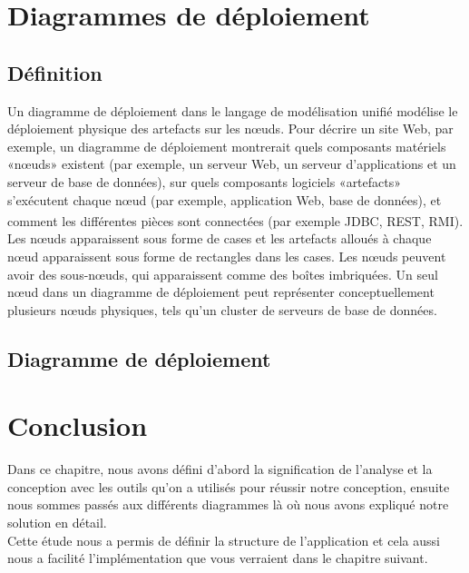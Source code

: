 \documentclass[12pt]{report}
\begin{document}
\newpage

\section{Diagrammes de déploiement}
\subsection{Définition}
\hspace*{0.16in}
Un diagramme de déploiement dans le langage de modélisation unifié modélise le déploiement physique des artefacts sur les nœuds. Pour décrire un site Web, par exemple, un diagramme de déploiement montrerait quels composants matériels «nœuds» existent (par exemple, un serveur Web, un serveur d’applications et un serveur de base de données), sur quels composants logiciels «artefacts» s’exécutent chaque nœud (par exemple, application Web, base de données), et comment les différentes pièces sont connectées (par exemple JDBC, REST, RMI). \textsuperscript{\cite{booch2005unified}}
\\
\hspace*{0.16in}
Les nœuds apparaissent sous forme de cases et les artefacts alloués à chaque nœud apparaissent sous forme de rectangles dans les cases. Les nœuds peuvent avoir des sous-nœuds, qui apparaissent comme des boîtes imbriquées. Un seul nœud dans un diagramme de déploiement peut représenter conceptuellement plusieurs nœuds physiques, tels qu’un cluster de serveurs de base de données.

\subsection{Diagramme de déploiement}

\newpage

\section{Conclusion}
\hspace*{0.16in}
Dans ce chapitre, nous avons défini d’abord la signification de l’analyse et la conception avec les outils qu’on a utilisés pour réussir notre conception, ensuite nous sommes passés aux différents diagrammes là où nous avons expliqué notre solution en détail. 
\\
\hspace*{0.16in}
Cette étude nous a permis de définir la structure de l’application et cela aussi nous a facilité l’implémentation que vous verraient dans le chapitre suivant.
\end{document}
